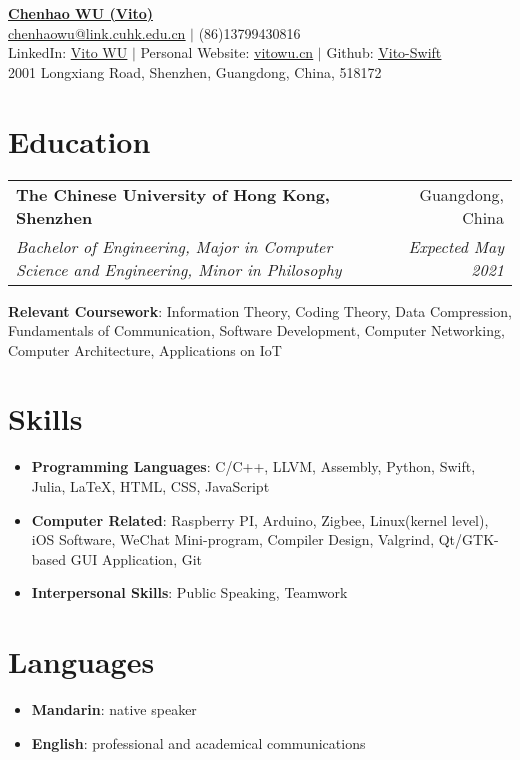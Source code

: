 \documentclass[letterpaper,10pt]{article}
\makeatletter
\newcommand{\resumeItemNoBullet}[2]{
	\item[]\small{
		\hspace{-9pt}\textbf{#1}{: #2 \vspace{-6pt}}
	}
}
\newcommand{\resumeSubheading}[4]{
	\vspace{-1pt}\item[]
	\begin{tabular*}{0.98\textwidth}{l@{\extracolsep{\fill}}r}
		\hspace{-10pt}\textbf{#1} & #2 \\
		\hspace{-10pt}\textit{\small#3} & \textit{\small #4} \\
	\end{tabular*}\vspace{-5pt}
}
\newcommand{\resumeSubHeadingListStart}{\begin{itemize}[leftmargin=*]}
\newcommand{\resumeSubHeadingListEnd}{\end{itemize}}
\newcommand{\shorterSection}[1]{\vspace{-10pt}\section{#1}}
\makeatother
\begin{document}
	
	\begin{center}
		\small \textbf{\href{http://vitowu.cn}{\huge Chenhao WU (Vito)}} \\  \href{mailto:chenhaowu@link.cuhk.edu.cn}{\color{blue}\underline{chenhaowu@link.cuhk.edu.cn}} $\vert$
		(86)13799430816 \\
		LinkedIn: \href{https://www.linkedin.com/in/vito-wu-56036a159/}{\color{blue}\underline{Vito WU}} $\vert$
		Personal Website: \href{http://www.vitowu.cn}{\color{blue}\underline{vitowu.cn}} $\vert$ Github: \href{https://github.com/Vito-Swift}{\color{blue}\underline{Vito-Swift}} \\
		\small 2001 Longxiang Road, Shenzhen, Guangdong, China, 518172
	\end{center}
	
	\shorterSection{Education}
	\resumeSubHeadingListStart
	\resumeSubheading
	{The Chinese University of Hong Kong, Shenzhen}{Guangdong, China}
	{Bachelor of Engineering, Major in Computer Science and Engineering, Minor in Philosophy}{Expected May 2021}{
		\resumeItemNoBullet{Relevant Coursework}{Information Theory, Coding Theory, Data Compression, Fundamentals of Communication, Software Development, Computer Networking, Computer Architecture, Applications on IoT}
	}
	\resumeSubHeadingListEnd
	
	\shorterSection{Skills}
	\resumeSubHeadingListStart
	\small
	\item{
		\textbf{Programming Languages}{: C/C++, LLVM, Assembly, Python, Swift,  Julia, LaTeX, HTML, CSS, JavaScript}
	}
	\vspace{-5pt}
	\item{
		\textbf{Computer Related}{: Raspberry PI, Arduino, Zigbee, Linux(kernel level), iOS Software, WeChat Mini-program, Compiler Design, Valgrind, Qt/GTK-based GUI Application, Git}
	}
	\vspace{-5pt}
	\item{
		\textbf{Interpersonal Skills}{: Public Speaking, Teamwork}
	}
	\resumeSubHeadingListEnd
	
	\shorterSection{Languages}
	\resumeSubHeadingListStart
	\small
	\item{
		\textbf{Mandarin}: native speaker
	}
	\vspace{-5pt}
	\item{
		\textbf{English}: professional and academical communications
	}
	\resumeSubHeadingListEnd
	
\end{document}
